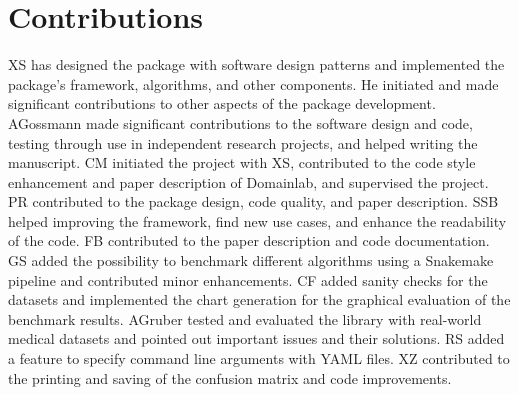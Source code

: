 \section{Contributions}\label{contributions}
XS has designed the package with software design patterns and
implemented the package's framework, algorithms, and other components.
He initiated and made significant contributions to other aspects of the
package development. AGossmann made significant contributions to the
software design and code, testing through use in independent research
projects, and helped writing the manuscript. CM initiated the project
with XS, contributed to the code style enhancement and paper description
of Domainlab, and supervised the project. PR contributed to the package
design, code quality, and paper description. SSB helped improving the
framework, find new use cases, and enhance the readability of the code.
FB contributed to the paper description and code documentation. GS added
the possibility to benchmark different algorithms using a Snakemake
pipeline and contributed minor enhancements. CF added sanity checks for
the datasets and implemented the chart generation for the graphical
evaluation of the benchmark results. AGruber tested and evaluated the
library with real-world medical datasets and pointed out important
issues and their solutions. RS added a feature to specify command line
arguments with YAML files. XZ contributed to the printing and saving of
the confusion matrix and code improvements.
